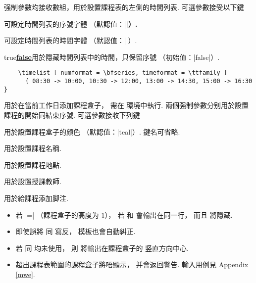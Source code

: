 \documentclass[svgnames]{l3doc}
\def \TFF {true\textup{\textbar\underline{\textbf{false}}}}
\begin{document}
\begin{documentation}
\begin{function}{\timelist}
  \begin{syntax}
       
  \end{syntax}
  强制參數均接收數組，用於設置課程表的左側的時間列表.
  可選參數接受以下鍵
  \begin{keyval}
    \item [\key{numformat}] 
    可設定時間列表的序號字體
    （默認值：|\ttfamily \bfseries|）.
    \item [\key{timefont}]  可設定時間列表的時間字體
    （默認值：|\ttfamily|）.
    \item [\key{hidetime}] \val\TFF 用於隱藏時間列表中的時間，只保留序號
    （初始值：|false|）.
  \end{keyval}
  \begin{verbatim}
    \timelist [ numformat = \bfseries, timeformat = \ttfamily ]
      { 08:30 -> 10:00, 10:30 -> 12:00, 13:00 -> 14:30, 15:00 -> 16:30 }
  \end{verbatim}
\end{function}

\begin{function}{\course}
  \begin{syntax}
         
  \end{syntax}
  用於在當前工作日添加課程盒子，
  需在  環境中執行.
  兩個强制參數分别用於設置課程的開始同結束序號.
  可選參數接收下列鍵
  \begin{keyval}
    \item [\key{color}]  用於設置課程盒子的颜色
    （默認值：|teal|）. 鍵名可省略.
    \item [\key{subject}]  用於設置課程名稱.
    \item [\key{location}]  用於設置課程地點.
    \item [\key{lecture}]  用於設置授課教師.
    \item [\key{comment}]  用於給課程添加脚注.
  \end{keyval}
  \begin{texnote}
    \begin{itemize}[leftmargin = 2em]
      \item 若  |=| （課程盒子的高度为 $1$），
      若  和  會輸出在同一行，
      而且  將隱藏.
      \item 即使誤將  同  寫反，
      模板也會自動糾正.
      \item 若  同  均未使用，
      則  將輸出在課程盒子的
      竖直方向中心.
      \item 超出課程表範圍的課程盒子將唔顯示，
      并會返回警告.
      輸入用例見 Appendix \ref{mwe}.
    \end{itemize}
  \end{texnote}
\end{function}


\end{documentation}
\end{document}
